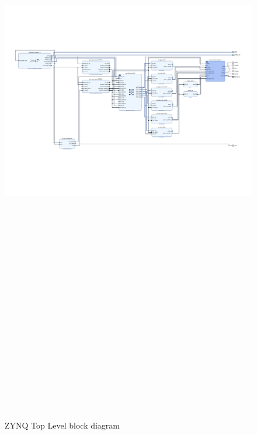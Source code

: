 \begin{landscape}
	\vspace*{\fill}
	\begin{figure}[htbp]
		\centering
		\includegraphics[width=20cm,height=28.7cm,keepaspectratio]{Figures/appendix/fpga/design_1.pdf}
		\caption{ZYNQ Top Level block diagram}
		\label{fig:app_fpga_block_diagram}
	\end{figure}
	\vspace*{\fill}
\end{landscape}


